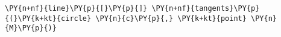 \begin{Verbatim}[commandchars=\\\{\}]
    \PY{n+nf}{line}\PY{p}{[}\PY{p}{]} \PY{n+nf}{tangents}\PY{p}{(}\PY{k+kt}{circle} \PY{n}{c}\PY{p}{,} \PY{k+kt}{point} \PY{n}{M}\PY{p}{)}
\end{Verbatim}
